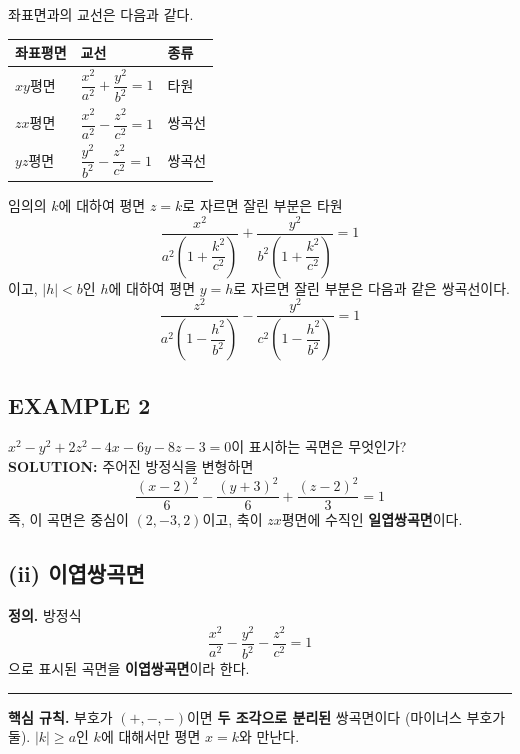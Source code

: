 \documentclass{article}
\theoremstyle{mystyle}
\begin{document}
좌표면과의 교선은 다음과 같다.

\begin{center}
\renewcommand{\arraystretch}{1.4}
\begin{tabular}{|l|l|l|}
\hline
좌표평면 & 교선 & 종류 \\
\hline
\(xy\)평면 & \(\dfrac{x^2}{a^2}+\dfrac{y^2}{b^2}=1\) & 타원 \\
\hline
\(zx\)평면 & \(\dfrac{x^2}{a^2}-\dfrac{z^2}{c^2}=1\) & 쌍곡선 \\
\hline
\(yz\)평면 & \(\dfrac{y^2}{b^2}-\dfrac{z^2}{c^2}=1\) & 쌍곡선 \\
\hline
\end{tabular}
\end{center}

임의의 \(k\)에 대하여 평면 \(z=k\)로 자르면 잘린 부분은 타원
\[
\frac{x^2}{a^2\left(1+\dfrac{k^2}{c^2}\right)}+\frac{y^2}{b^2\left(1+\dfrac{k^2}{c^2}\right)}=1
\]
이고, \(|h|<b\)인 \(h\)에 대하여 평면 \(y=h\)로 자르면 잘린 부분은 다음과 같은 쌍곡선이다.
\[
\frac{z^2}{a^2\left(1-\dfrac{h^2}{b^2}\right)}-\frac{y^2}{c^2\left(1-\dfrac{h^2}{b^2}\right)}=1
\]

\subsection*{EXAMPLE 2}
\(x^2-y^2+2z^2-4x-6y-8z-3=0\)이 표시하는 곡면은 무엇인가?\\
\textbf{SOLUTION:} 주어진 방정식을 변형하면
\[
\frac{(x-2)^2}{6}-\frac{(y+3)^2}{6}+\frac{(z-2)^2}{3}=1
\]
즉, 이 곡면은 중심이 \((2,-3,2)\)이고, 축이 \(zx\)평면에 수직인 \textbf{일엽쌍곡면}이다.

\subsection*{(ii) 이엽쌍곡면}

\begin{tcolorbox}[
    colback=teal!4,
    colframe=teal!65!black,
    title=정의 \& 핵심 규칙,
    fonttitle=\bfseries,
    boxrule=0.5mm,
    arc=3mm
    ]
    \textbf{\textcolor{teal!65!black}{정의.}}\quad
    방정식
    \[
    \frac{x^2}{a^2}-\frac{y^2}{b^2}-\frac{z^2}{c^2}=1 \tag{3}
    \]
    으로 표시된 곡면을 \textbf{이엽쌍곡면}이라 한다.

    \noindent\textcolor{teal!50!black}{\rule{\linewidth}{0.4pt}}

    \textbf{\textcolor{teal!65!black}{핵심 규칙.}}\quad
    부호가 \((+,-,-)\)이면 \textbf{두 조각으로 분리된} 쌍곡면이다 (마이너스 부호가 둘). \(|k|\ge a\)인 \(k\)에 대해서만 평면 \(x=k\)와 만난다.
\end{tcolorbox}
\end{document}
